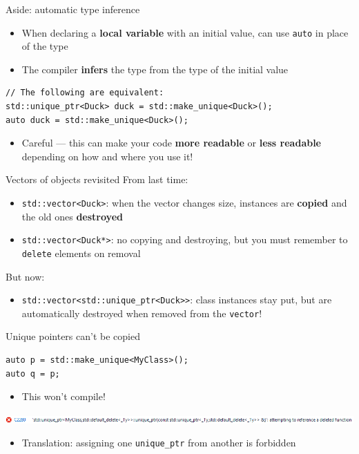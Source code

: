 \begin{frame}[fragile]{Aside: automatic type inference}
    \begin{itemize}
        \item When declaring a \textbf{local variable} with an initial value,
            can use \lstinline{auto} in place of the type
        \item The compiler \textbf{infers} the type from the type of the initial value
    \end{itemize}
    \begin{lstlisting}
// The following are equivalent:
std::unique_ptr<Duck> duck = std::make_unique<Duck>();
auto duck = std::make_unique<Duck>();
    \end{lstlisting}
    \begin{itemize}
        \item Careful --- this can make your code \textbf{more readable} or \textbf{less readable}
            depending on how and where you use it!
    \end{itemize}
\end{frame}

\begin{frame}{Vectors of objects revisited}
    From last time:
    \begin{itemize}
        \item \lstinline{std::vector<Duck>}: when the vector changes size, instances are 
            \textbf{copied} and the old ones \textbf{destroyed}
        \item \lstinline{std::vector<Duck*>}: no copying and destroying, but you must
            remember to \lstinline{delete} elements on removal
    \end{itemize}
    But now:
    \begin{itemize}
        \item \lstinline{std::vector<std::unique_ptr<Duck>>}: class instances stay put,
            but are automatically destroyed when removed from the \lstinline{vector}!
    \end{itemize}
\end{frame}

\begin{frame}[fragile]{Unique pointers can't be copied}
    \begin{lstlisting}
auto p = std::make_unique<MyClass>();
auto q = p;
    \end{lstlisting}
    \begin{itemize}
        \item This won't compile!
    \end{itemize}
    \includegraphics[width=\textwidth]{unique_ptr_error}
    \begin{itemize}
        \item Translation: assigning one \lstinline{unique_ptr} from another is forbidden
    \end{itemize}
\end{frame}

